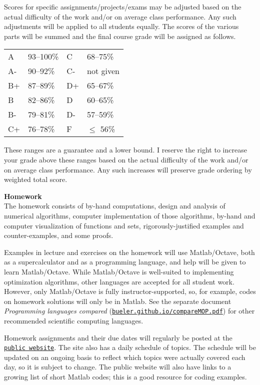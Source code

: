 \documentclass[12pt]{article}
\renewcommand{\emph}[1]{\textsf{\textbf{#1}}}
\newcommand{\localhead}[1]{\par\smallskip\textbf{#1} \smallskip\nobreak\\}%
\def\heading#1{\localhead{\large\emph{#1}}}
\begin{document}
Scores for specific assignments/projects/exams may be adjusted based on the actual difficulty of the work and/or on average class performance.  Any such adjustments will be applied to all students equally.  The scores of the various parts will be summed and the final course grade will be assigned as follows.

\begin{tabular}{llll}
A  & 93--100\%& C  & 68--75\%  \\
A- & 90--92\% & C- & not given \\
B+ & 87--89\% & D+ & 65--67\%  \\
B  & 82--86\% & D  & 60--65\%  \\
B- & 79--81\% & D- & 57--59\%  \\
C+ & 76--78\% & F  & $\le$ 56\%
\end{tabular}

These ranges are a guarantee and a lower bound.  I reserve the right to increase your grade above these ranges based on the actual difficulty of the work and/or on average class performance.  Any such increases will preserve grade ordering by weighted total score.


\clearpage\newpage
\strut\vspace{-10pt}

\heading{Homework}
The homework consists of by-hand computations, design and analysis of numerical algorithms, computer implementation of those algorithms, by-hand and computer visualization of functions and sets, rigorously-justified examples and counter-examples, and some proofs.

Examples in lecture and exercises on the homework will use Matlab/Octave, both as a supercalculator and as a programming language, and help will be given to learn Matlab/Octave.  While Matlab/Octave is well-suited to implementing optimization algorithms, other languages are accepted for all student work.  However, only Matlab/Octave is fully instructor-supported, so, for example, codes on homework solutions will only be in Matlab.  See the separate document \textsl{Programming languages compared} (\href{https://bueler.github.io/compareMOP.pdf}{\texttt{bueler.github.io/compareMOP.pdf}}) for other recommended scientific computing languages.

Homework assignments and their due dates will regularly be posted at the \href{https://bueler.github.io/opt/}{\texttt{public website}}.  The site also has a daily schedule of topics.  The schedule will be updated on an ongoing basis to reflect which topics were actually covered each day, so it is subject to change.  The public website will also have links to a growing list of short Matlab codes; this is a good resource for coding examples.
\end{document}
